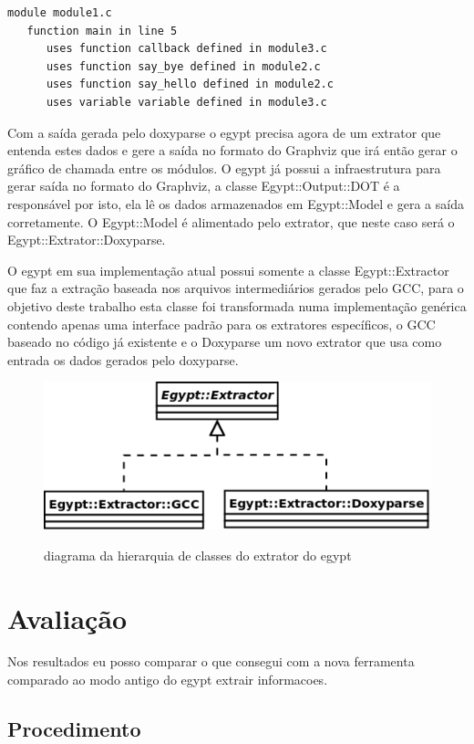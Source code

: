 \begin{verbatim}
module module1.c
   function main in line 5
      uses function callback defined in module3.c
      uses function say_bye defined in module2.c
      uses function say_hello defined in module2.c
      uses variable variable defined in module3.c
\end{verbatim}

Com a saída gerada pelo doxyparse o egypt precisa agora de um extrator que
entenda estes dados e gere a saída no formato do Graphviz que irá então gerar o
gráfico de chamada entre os módulos. O egypt já possui a infraestrutura
para gerar saída no formato do Graphviz, a classe Egypt::Output::DOT é a
responsável por isto, ela lê os dados armazenados em Egypt::Model e gera a
saída corretamente. O Egypt::Model é alimentado pelo extrator, que neste caso será
o Egypt::Extrator::Doxyparse.

O egypt em sua implementação atual possui somente a classe Egypt::Extractor que
faz a extração baseada nos arquivos intermediários gerados pelo GCC, para o
objetivo deste trabalho esta classe foi transformada numa implementação
genérica contendo apenas uma interface padrão para os extratores específicos, o
GCC baseado no código já existente e o Doxyparse um novo extrator que usa como
entrada os dados gerados pelo doxyparse.

\begin{figure}[h]
\center
\includegraphics[scale=0.5]{imagens/egypt-diagram-extractor}
\label{egypt-diagram-extractor}
\caption{diagrama da hierarquia de classes do extrator do egypt}
\end{figure}

\chapter{Avaliação}

Nos resultados eu posso comparar o que consegui com a nova ferramenta comparado ao modo antigo do egypt extrair informacoes.

\section{Procedimento}

